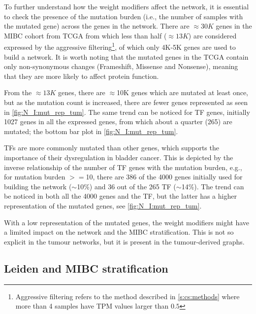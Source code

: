 To further understand how the weight modifiers affect the network, it is essential to check the presence of the mutation burden (i.e., the number of samples with the mutated gene) across the genes in the network. There are $\approx30K$ genes in the MIBC cohort from TCGA from which less than half ($\approx13K$) are considered expressed by the aggressive filtering\footnote{Aggressive filtering refers to the method described in \cref{s:cs:methods} where more than 4 samples have TPM values larger than $0.5$}, of which only 4K-5K genes are used to build a network. It is worth noting that the mutated genes in the TCGA contain only non-synonymous changes (Frameshift, Missense and Nonsense), meaning that they are more likely to affect protein function.

From the $\approx13K$ genes, there are $\approx$10K genes which are mutated at least once, but as the mutation count is increased, there are fewer genes represented as seen in \cref{fig:N_I:mut_rep_tum}. The same trend can be noticed for TF genes, initially 1027 genes in all the expressed genes, from which about a quarter (265) are mutated; the bottom bar plot in \cref{fig:N_I:mut_rep_tum}.

TFs are more commonly mutated than other genes, which supports the importance of their dysregulation in bladder cancer. This is depicted by the inverse relationship of the number of TF genes with the mutation burden, e.g., for mutation burden $>=$10, there are 386 of the 4000 genes initially used for building the network ($\sim$10\%) and 36 out of the 265 TF ($\sim$14\%). The trend can be noticed in both all the 4000 genes and the TF, but the latter has a higher representation of the mutated genes, see \cref{fig:N_I:mut_rep_tum}. 

With a low representation of the mutated genes, the weight modifiers might have a limited impact on the network and the MIBC stratification. This is not so explicit in the tumour networks, but it is present in the tumour-derived graphs.


\subsection{Leiden and MIBC stratification} \label{s:N_I:tum_stratification}


